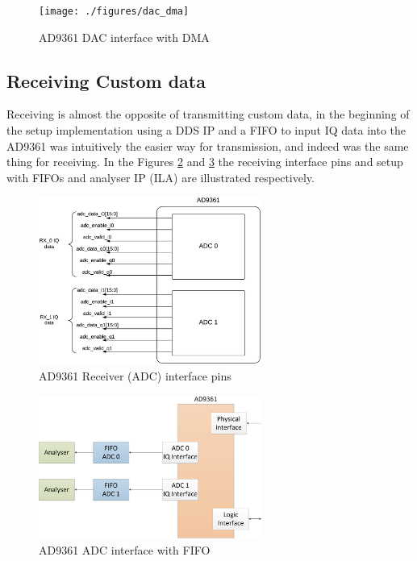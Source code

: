 \begin{figure}[htbp]
    \centering
    \texttt{[image: ./figures/dac\_dma]}
    \caption{ AD9361 DAC interface with DMA
    \label{fig:ad9361txdma}}
\end{figure}

\subsection{Receiving Custom data}

Receiving is almost the opposite of transmitting custom data, in the beginning
of the setup implementation using a DDS IP and a FIFO to input IQ data into the
AD9361 was intuitively the easier way for transmission, and indeed was the same
thing for receiving. In the Figures \ref{fig:rxpins} and \ref{fig:ad9361rxfifo}
the receiving interface pins and setup with FIFOs and analyser IP (ILA) are
illustrated respectively.

\begin{figure}[htbp]
    \centering
    \includegraphics[width=0.65\textwidth]{./figures/ad9361rx_pins}
    \caption{ AD9361 Receiver (ADC) interface pins
    \label{fig:rxpins}}
\end{figure}

\begin{figure}[htbp]
    \centering
    \includegraphics[width=0.65\textwidth]{./figures/adc_fifo}
    \caption{ AD9361 ADC interface with FIFO
    \label{fig:ad9361rxfifo}}
\end{figure}

